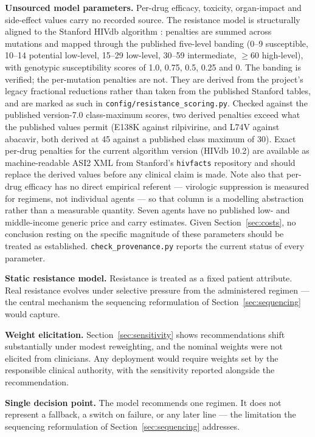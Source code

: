 \documentclass[conference]{IEEEtran}
\begin{document}
\textbf{Unsourced model parameters.} Per-drug efficacy, toxicity, organ-impact and side-effect values carry no recorded source. The resistance model is structurally aligned to the Stanford HIVdb algorithm \cite{liu2006}: penalties are summed across mutations and mapped through the published five-level banding (0--9 susceptible, 10--14 potential low-level, 15--29 low-level, 30--59 intermediate, $\geq$60 high-level), with genotypic susceptibility scores of 1.0, 0.75, 0.5, 0.25 and 0. The banding is verified; the per-mutation penalties are not. They are derived from the project's legacy fractional reductions rather than taken from the published Stanford tables, and are marked as such in \texttt{config/resistance\_\allowbreak{}scoring.py}. Checked against the published version-7.0 class-maximum scores, two derived penalties exceed what the published values permit (E138K against rilpivirine, and L74V against abacavir, both derived at 45 against a published class maximum of 30). Exact per-drug penalties for the current algorithm version (HIVdb 10.2) are available as machine-readable ASI2 XML from Stanford's \texttt{hivfacts} repository and should replace the derived values before any clinical claim is made. Note also that per-drug efficacy has no direct empirical referent --- virologic suppression is measured for regimens, not individual agents --- so that column is a modelling abstraction rather than a measurable quantity. Seven agents have no published low- and middle-income generic price and carry estimates. Given Section~\ref{sec:costs}, no conclusion resting on the specific magnitude of these parameters should be treated as established. \texttt{check\_\allowbreak{}provenance.py} reports the current status of every parameter.

\textbf{Static resistance model.} Resistance is treated as a fixed patient attribute. Real resistance evolves under selective pressure from the administered regimen --- the central mechanism the sequencing reformulation of Section~\ref{sec:sequencing} would capture.

\textbf{Weight elicitation.} Section~\ref{sec:sensitivity} shows recommendations shift substantially under modest reweighting, and the nominal weights were not elicited from clinicians. Any deployment would require weights set by the responsible clinical authority, with the sensitivity reported alongside the recommendation.

\textbf{Single decision point.} The model recommends one regimen. It does not represent a fallback, a switch on failure, or any later line --- the limitation the sequencing reformulation of Section~\ref{sec:sequencing} addresses.
\end{document}
